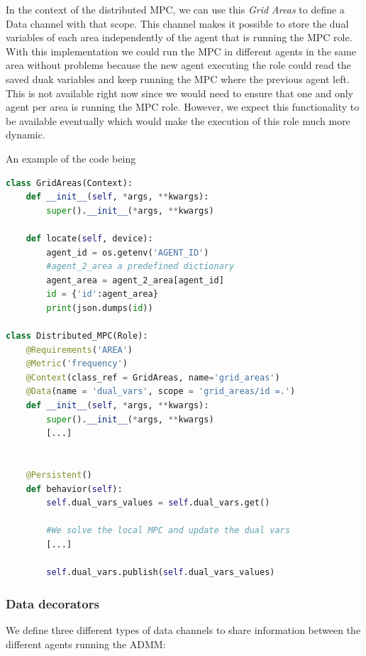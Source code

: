 \documentclass{article}
\begin{document}
In the context of the distributed MPC, we can use this \textit{Grid Areas} to define a Data channel with that scope. This channel makes it possible to store the dual variables of each area independently of the agent that is running the MPC role. With this implementation we could run the MPC in different agents in the same area without problems because the new agent executing the role could read the saved duak variables and keep running the MPC where the previous agent left. This is not available right now since we would need to ensure that one and only agent per area is running the MPC role. However, we expect  this functionality to be available eventually which would make the execution of this role much more dynamic.

An example of the code being 

\begin{lstlisting}[language=Python]
class GridAreas(Context):
    def __init__(self, *args, **kwargs):
        super().__init__(*args, **kwargs)
    
    def locate(self, device):
        agent_id = os.getenv('AGENT_ID')
        #agent_2_area a predefined dictionary
        agent_area = agent_2_area[agent_id]
        id = {'id':agent_area}
        print(json.dumps(id))

class Distributed_MPC(Role):
    @Requirements('AREA')
    @Metric('frequency')
    @Context(class_ref = GridAreas, name='grid_areas')
    @Data(name = 'dual_vars', scope = 'grid_areas/id =.')
    def __init__(self, *args, **kwargs):
        super().__init__(*args, **kwargs)
        [...]


    @Persistent()
    def behavior(self):
        self.dual_vars_values = self.dual_vars.get()

        #We solve the local MPC and update the dual vars 
        [...]

        self.dual_vars.publish(self.dual_vars_values)
\end{lstlisting}


\subsubsection*{Data decorators}

We define three different types of data channels to share information between the different agents running the ADMM:
\end{document}
